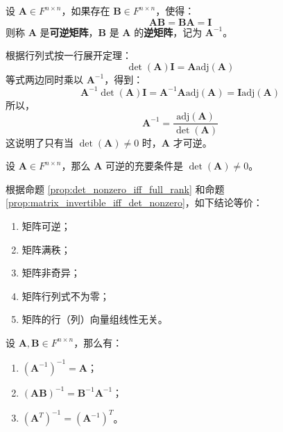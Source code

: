 \begin{definition}
    设 $\mathbf{A} \in F^{n \times n}$，如果存在 $\mathbf{B} \in F^{n \times n}$，使得：
    \[
        \mathbf{A}\mathbf{B} = \mathbf{B}\mathbf{A} = \mathbf{I}
    \]
    则称 $\mathbf{A}$ 是\textbf{可逆矩阵}，$\mathbf{B}$ 是 $\mathbf{A}$ 的\textbf{逆矩阵}，记为 $\mathbf{A}^{-1}$。
\end{definition}

\begin{note}
    根据行列式按一行展开定理：
    \[
        \det(\mathbf{A}) \mathbf{I} = \mathbf{A}\mathrm{adj}(\mathbf{A})
    \]
    等式两边同时乘以 $\mathbf{A}^{-1}$，得到：
    \[
        \mathbf{A}^{-1}\det(\mathbf{A}) \mathbf{I} = \mathbf{A}^{-1}\mathbf{A}\mathrm{adj}(\mathbf{A}) = \mathbf{I}\mathrm{adj}(\mathbf{A})
    \]
    所以，
    \[
        \mathbf{A}^{-1} = \frac{\mathrm{adj}(\mathbf{A})}{\det(\mathbf{A})}
    \]
    这说明了只有当 $\det(\mathbf{A}) \neq 0$ 时，$\mathbf{A}$ 才可逆。
\end{note}

\begin{proposition}[矩阵可逆的充要条件]
    设 $\mathbf{A} \in F^{n \times n}$，那么 $\mathbf{A}$ 可逆的充要条件是 $\det(\mathbf{A}) \neq 0$。
    \label{prop:matrix_invertible_iff_det_nonzero}
\end{proposition}

\begin{note}
    根据命题 \ref{prop:det_nonzero_iff_full_rank} 和命题 \ref{prop:matrix_invertible_iff_det_nonzero}，如下结论等价：
    \begin{enumerate}
        \item 矩阵可逆；
        \item 矩阵满秩；
        \item 矩阵非奇异；
        \item 矩阵行列式不为零；
        \item 矩阵的行（列）向量组线性无关。
    \end{enumerate}
\end{note}

\begin{proposition}[矩阵逆的性质]
    设 $\mathbf{A},\mathbf{B} \in F^{n \times n}$，那么有：
    \begin{enumerate}
        \item $(\mathbf{A}^{-1})^{-1} = \mathbf{A}$；
        \item $(\mathbf{A}\mathbf{B})^{-1} = \mathbf{B}^{-1}\mathbf{A}^{-1}$；
        \item $(\mathbf{A}^T)^{-1} = (\mathbf{A}^{-1})^T$。
    \end{enumerate}
\end{proposition}

